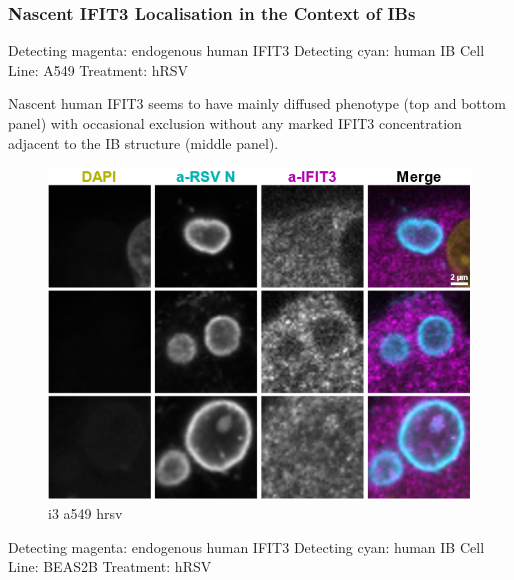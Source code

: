 \subsubsection{Nascent IFIT3 Localisation in the Context of IBs} \label{Nascent IFIT3 Localisation in the Context of IBs}
Detecting magenta: endogenous human IFIT3 \newline
Detecting cyan: human IB \newline
Cell Line: A549 \newline
Treatment: hRSV \newline

Nascent human IFIT3 seems to have mainly diffused phenotype (top and bottom panel) with occasional exclusion without any marked IFIT3 concentration adjacent to the IB structure (middle panel).

\begin{figure}
    \centering
    \includegraphics[width=1\linewidth]{09. Chapter 4/Figs/04. IFIT3/02. a549 hrsv.png}
    \caption[i3 a549 hrsv]{i3 a549 hrsv}
    \label{fig:i3 a549 hrsv}
\end{figure}

Detecting magenta: endogenous human IFIT3 \newline
Detecting cyan: human IB \newline
Cell Line: BEAS2B \newline
Treatment: hRSV \newline

